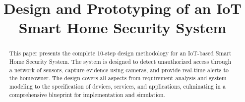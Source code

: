 \documentclass[conference]{IEEEtran}
\begin{document}
\title{Design and Prototyping of an IoT Smart Home Security System\\
}

\author{
\and
{}
\and
{}
\and
{}
\and
{}
}

\maketitle

\begin{abstract}
This paper presents the complete 10-step design methodology for an IoT-based Smart Home Security System. The system is designed to detect unauthorized access through a network of sensors, capture evidence using cameras, and provide real-time alerts to the homeowner. The design covers all aspects from requirement analysis and system modeling to the specification of devices, services, and applications, culminating in a comprehensive blueprint for implementation and simulation.
\end{abstract}
\end{document}
